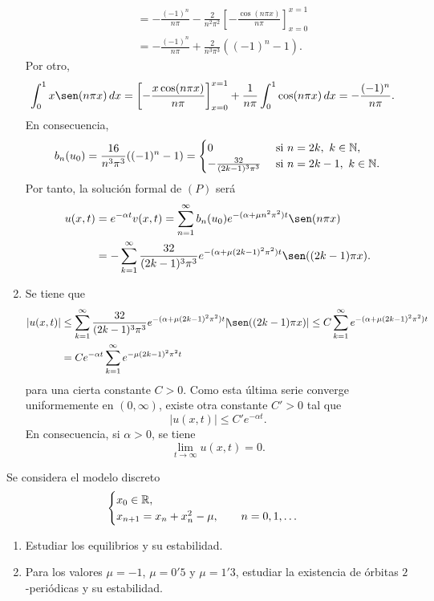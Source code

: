 \documentclass[11pt]{report}
\begin{document}
\begin{solution}
\begin{enumerate}
\begin{align*}
            &= -\frac{(-1)^n}{n\pi} - \frac{2}{n^2\pi^2}\left[-\frac{\cos(n\pi x)}{n\pi}\right]_{x=0}^{x=1}  \\
            &= -\frac{(-1)^n}{n\pi} + \frac{2}{n^3\pi^3}((-1)^n-1).
        \end{align*}
        Por otro,
        \begin{align*}
            \int_0^1x\sen(n\pi x)\, dx &= \left[-\frac{x\cos(n\pi x)}{n\pi}\right]_{x=0}^{x=1}+\frac{1}{n\pi}\int_0^1\cos(n\pi x)\, dx = -\frac{(-1)^n}{n\pi}.
        \end{align*}
        En consecuencia,
        \[b_n(u_0) = \frac{16}{n^3\pi^3}((-1)^n-1) = \begin{cases}
            0 & $ si $ n = 2k, \ k \in \N, \\
            -\frac{32}{(2k-1)^3\pi^3} & $ si $ n = 2k-1, \ k \in \N.
        \end{cases}\]
        Por tanto, la solución formal de $(P)$ será
        \begin{align*}
            u(x,t) &= e^{-\alpha t}v(x,t) = \sum_{n=1}^\infty b_n(u_0)e^{-(\alpha+\mu n^2\pi^2) t}\sen(n\pi x) \\ 
            &= -\sum_{k=1}^\infty\frac{32}{(2k-1)^3\pi^3}e^{-(\alpha+\mu(2k-1)^2\pi^2)t}\sen((2k-1)\pi x).
        \end{align*}
        \item Se tiene que
        \begin{align*}
            |u(x,t)| &\leq \sum_{k=1}^\infty\frac{32}{(2k-1)^3\pi^3}e^{-(\alpha+\mu(2k-1)^2\pi^2)t}|\!\sen((2k-1)\pi x)| \leq C\sum_{k=1}^\infty e^{-(\alpha+\mu(2k-1)^2\pi^2)t} \\
            &= Ce^{-\alpha t}\sum_{k=1}^\infty e^{-\mu(2k-1)^2\pi^2t}
        \end{align*}
        para una cierta constante $C>0$. Como esta última serie converge uniformemente en $(0,\infty)$, existe otra constante $C'>0$ tal que
        \[|u(x,t)| \leq C'e^{-\alpha t}.\]
        En consecuencia, si $\alpha > 0$, se tiene
        \[\lim_{t\to\infty} u(x,t) = 0. \]
    \end{enumerate}
\end{solution}

\begin{exercise}[Junio de 2024]
    Se considera el modelo discreto
    \[\begin{cases}
        x_0\in\mathbb R, \\
        x_{n+1} = x_n+x_n^2-\mu, \qquad n = 0,1,\mathellipsis
    \end{cases}\]
    \begin{enumerate}
        \item Estudiar los equilibrios y su estabilidad.
        \item Para los valores $\mu = -1$, $\mu = 0'5$ y $\mu = 1'3$, estudiar la existencia de órbitas $2$-periódicas y su estabilidad.
    \end{enumerate}
\end{exercise}
\end{document}
